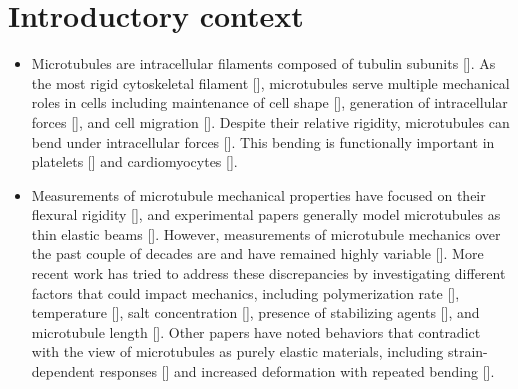 % 
% 
% 

% 
% 

\section{Introductory context}
\begin{itemize}
    \item Microtubules are intracellular filaments composed of tubulin subunits [\cite{rev_nogales}]. As the most rigid cytoskeletal filament [\cite{rev_mechanics}], microtubules serve multiple mechanical roles in cells including maintenance of cell shape [\cite{rev_org-shape}], generation of intracellular forces [\cite{rev_push-pull}], and cell migration [\cite{rev_migration}]. Despite their relative rigidity, microtubules can bend under intracellular forces [\cite{p_bend-in-cells}]. This bending is functionally important in platelets [\cite{rev_platelet-MTs}] and cardiomyocytes [\cite{rev_carmy-MTs}].
    \item Measurements of microtubule mechanical properties have focused on their flexural rigidity [\cite{p_thermal-flex}], and experimental papers generally model microtubules as thin elastic beams [\cite{rev_mechanics}]. However, measurements of microtubule mechanics over the past couple of decades are and have remained highly variable [\cite{rev_hawkins}]. More recent work has tried to address these discrepancies by investigating different factors that could impact mechanics, including polymerization rate [\cite{p_growth-rate-1, p_growth-rate-2}], temperature [\cite{p_temp}], salt concentration [\cite{p_salt}], presence of stabilizing agents [\cite{p_stabilize}], and microtubule length [\cite{p_length-1}]. Other papers have noted behaviors that contradict with the view of microtubules as purely elastic materials, including strain-dependent responses [\cite{p_strain-soften}] and increased deformation with repeated bending [\cite{p_repeated-flow}].
\end{itemize}

